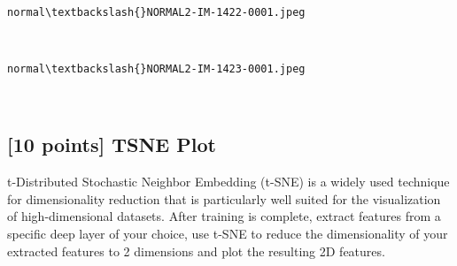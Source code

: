 \documentclass[11pt]{article}
\begin{document}
    \begin{center}
    \end{center}
    { \hspace*{\fill} \\}
    
    \begin{Verbatim}[commandchars=\\\{\}]
normal\textbackslash{}NORMAL2-IM-1422-0001.jpeg
    \end{Verbatim}

    \begin{center}
    \end{center}
    { \hspace*{\fill} \\}
    
    \begin{Verbatim}[commandchars=\\\{\}]
normal\textbackslash{}NORMAL2-IM-1423-0001.jpeg
    \end{Verbatim}

    \begin{center}
    \end{center}
    { \hspace*{\fill} \\}
    
    \hypertarget{points-tsne-plot}{%
\subsection{{[}10 points{]} TSNE Plot}\label{points-tsne-plot}}

t-Distributed Stochastic Neighbor Embedding (t-SNE) is a widely used
technique for dimensionality reduction that is particularly well suited
for the visualization of high-dimensional datasets. After training is
complete, extract features from a specific deep layer of your choice,
use t-SNE to reduce the dimensionality of your extracted features to 2
dimensions and plot the resulting 2D features.
\end{document}
